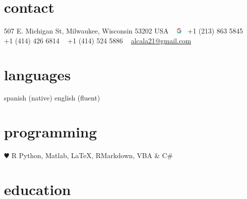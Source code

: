 \documentclass[]{../friggeri-cv} %
\begin{document}


\begin{aside} %
\section{contact}
507 E. Michigan St,
Milwaukee, Wisconsin 53202
USA
~
\includegraphics[width = 8pt]{../../figures/google-icon.png}~ +1 (213) 863 5845
\Mobilefone~ +1 (414) 426 6814
\Telefon~ +1 (414) 524 5886
~
\href{mailto:alcala21@gmail.com}{alcala21@gmail.com}
\section{languages}
spanish (native)
english (fluent)
\section{programming}
{\color{red} $\varheartsuit$} R
Python, Matlab,
\LaTeX, RMarkdown,
VBA \& C\#
\end{aside}


\section{education}
\end{document}
